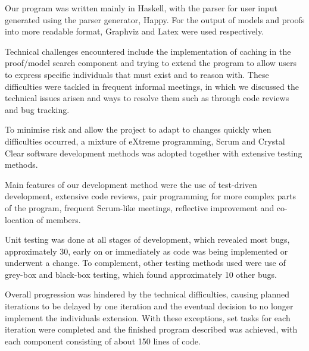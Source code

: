 
Our program was written mainly in Haskell, with the parser for user input generated using the parser generator, Happy. For the output of models and proofs into more readable format, Graphviz and Latex were used respectively.

Technical challenges encountered include the implementation of caching in the proof/model search component and trying to extend the program to allow users to express specific individuals that must exist and to reason with. These difficulties were tackled in frequent informal meetings, in which we discussed the technical issues arisen and ways to resolve them such as through code reviews and bug tracking.

To minimise risk and allow the project to adapt to changes quickly when difficulties occurred, a mixture of eXtreme programming, Scrum and Crystal Clear software development methods was adopted together with extensive testing methods.

Main features of our development method were the use of test-driven development, extensive code reviews, pair programming for more complex parts of the program, frequent Scrum-like meetings, reflective improvement and co-location of members.

Unit testing was done at all stages of development, which revealed most bugs, approximately 30, early on or immediately as code was being implemented or underwent a change. To complement, other testing methods used were use of grey-box and black-box testing, which found approximately 10 other bugs.

Overall progression was hindered by the technical difficulties, causing planned iterations to be delayed by one iteration and the eventual decision to no longer implement the individuals extension. With these exceptions, set tasks for each iteration were completed and the finished program described was achieved, with each component consisting of about 150 lines of code.
